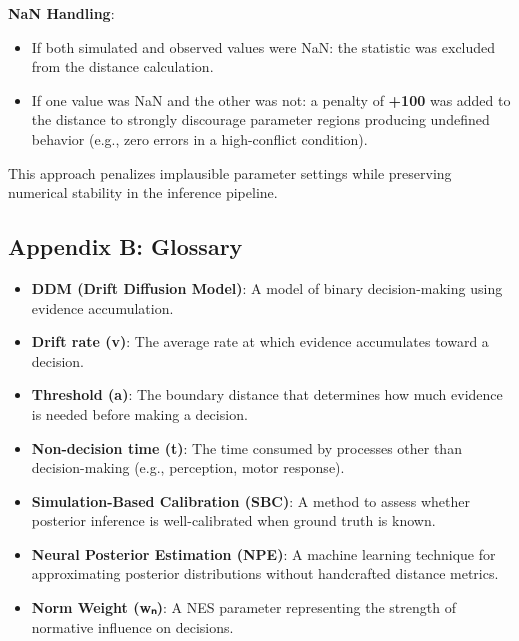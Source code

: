 \documentclass[
  11pt,
]{article}
\providecommand{\tightlist}{%
  \setlength{\itemsep}{0pt}\setlength{\parskip}{0pt}}
\begin{document}
\textbf{NaN Handling}:

\begin{itemize}
\tightlist
\item
  If both simulated and observed values were NaN: the statistic was
  excluded from the distance calculation.
\item
  If one value was NaN and the other was not: a penalty of \textbf{+100}
  was added to the distance to strongly discourage parameter regions
  producing undefined behavior (e.g., zero errors in a high-conflict
  condition).
\end{itemize}

This approach penalizes implausible parameter settings while preserving
numerical stability in the inference pipeline.

\subsection{Appendix B: Glossary}\label{appendix-b-glossary}

\begin{itemize}
\item
  \textbf{DDM (Drift Diffusion Model)}: A model of binary
  decision-making using evidence accumulation.
\item
  \textbf{Drift rate (v)}: The average rate at which evidence
  accumulates toward a decision.
\item
  \textbf{Threshold (a)}: The boundary distance that determines how much
  evidence is needed before making a decision.
\item
  \textbf{Non-decision time (t)}: The time consumed by processes other
  than decision-making (e.g., perception, motor response).
\item
  \textbf{Simulation-Based Calibration (SBC)}: A method to assess
  whether posterior inference is well-calibrated when ground truth is
  known.
\item
  \textbf{Neural Posterior Estimation (NPE)}: A machine learning
  technique for approximating posterior distributions without
  handcrafted distance metrics.
\item
  \textbf{Norm Weight (wₙ)}: A NES parameter representing the strength
  of normative influence on decisions.
\end{itemize}
\end{document}
